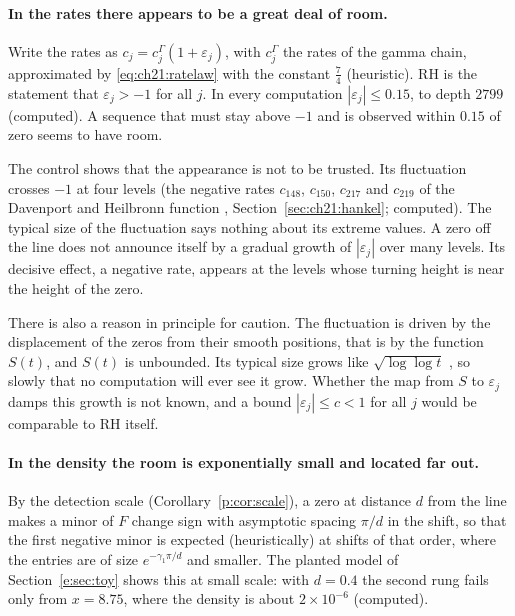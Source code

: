 \paragraph{In the rates there appears to be a great deal of room.} Write the rates as $c_j=c_j^\Gamma(1+\varepsilon_j)$, with $c_j^\Gamma$ the rates of the gamma chain, approximated by \eqref{eq:ch21:ratelaw} with the constant $\frac74$ (heuristic). RH is the statement that $\varepsilon_j>-1$ for all $j$. In every computation $|\varepsilon_j|\le0.15$, to depth $2799$ (computed). A sequence that must stay above $-1$ and is observed within $0.15$ of zero seems to have room.

The control shows that the appearance is not to be trusted. Its fluctuation crosses $-1$ at four levels (the negative rates $c_{148}$, $c_{150}$, $c_{217}$ and $c_{219}$ of the Davenport and Heilbronn function \cite{DH36}, Section~\ref{sec:ch21:hankel}; computed). The typical size of the fluctuation says nothing about its extreme values. A zero off the line does not announce itself by a gradual growth of $|\varepsilon_j|$ over many levels. Its decisive effect, a negative rate, appears at the levels whose turning height is near the height of the zero.

There is also a reason in principle for caution. The fluctuation is driven by the displacement of the zeros from their smooth positions, that is by the function $S(t)$, and $S(t)$ is unbounded. Its typical size grows like $\sqrt{\log\log t}$ \cite{Selberg46}, so slowly that no computation will ever see it grow. Whether the map from $S$ to $\varepsilon_j$ damps this growth is not known, and a bound $|\varepsilon_j|\le c<1$ for all $j$ would be comparable to RH itself.

\paragraph{In the density the room is exponentially small and located far out.} By the detection scale (Corollary~\ref{p:cor:scale}), a zero at distance $d$ from the line makes a minor of $F$ change sign with asymptotic spacing $\pi/d$ in the shift, so that the first negative minor is expected (heuristically) at shifts of that order, where the entries are of size $e^{-\gamma_1\pi/d}$ and smaller. The planted model of Section~\ref{e:sec:toy} shows this at small scale: with $d=0.4$ the second rung fails only from $x=8.75$, where the density is about $2\times10^{-6}$ (computed).%

